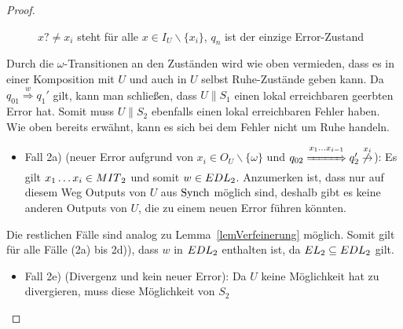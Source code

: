 \begin{proof}
\begin{itemize}
\begin{figure} [h!tbp]
\begin{center}
        \caption{$x?\neq x_i$ steht für alle $x\in I_U\backslash\{x_i\}$, $q_n$
          ist der einzige Error-Zustand}
\label{UmitEundO}
      \end{center}
      \end{figure}
      Durch die $\omega$-Transitionen an den Zuständen wird wie oben vermieden,
      dass es in einer Komposition mit $U$ und auch in $U$ selbst Ruhe-Zustände
      geben kann. Da $q_{01} \overset{w}{\Rightarrow} q_1'$ gilt, kann man schließen,
      dass $U\|S_1$ einen lokal erreichbaren geerbten Error hat. Somit muss
      $U\|S_2$ ebenfalls einen lokal erreichbaren Fehler haben. Wie oben
      bereits erwähnt, kann es sich bei dem Fehler nicht um Ruhe handeln.
      \begin{itemize}
        \item Fall 2a) \big(neuer Error aufgrund von $x_i\in O_U\backslash
          \{\omega\}$ und $q_{02} \overset{x_1\dots
          x_{i-1}}{\xRightarrow{\hspace{1cm}}} q_2'
          \overset{x_i}{\not{\hspace{-0.1cm}\rightarrow}}$\big): Es gilt $x_1\dots
          x_i\in MIT{}_2$ und somit $w\in EDL{}_2$. Anzumerken ist, dass nur
          auf diesem Weg Outputs von $U$ aus $\mathrm{Synch}$ möglich sind, deshalb gibt
          es keine anderen Outputs von $U$, die zu einem neuen Error führen
          könnten.
      \end{itemize}
      Die restlichen Fälle sind analog zu Lemma~\ref{lemVerfeinerung} möglich.
      Somit gilt für alle Fälle (2a) bis 2d)), dass $w$ in $EDL{}_2$ enthalten
      ist, da $EL{}_2\subseteq EDL{}_2$ gilt.
      \begin{itemize}
        \item Fall 2e) (Divergenz und kein neuer Error): Da $U$ keine
          Möglichkeit hat zu divergieren, muss diese Möglichkeit von $S_2$

\end{itemize}
\end{itemize}
\end{proof}
